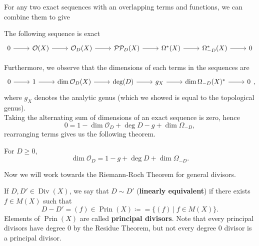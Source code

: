 \documentclass{article}
\begin{document}
{For any two exact sequences with an overlapping terms and functions, we can combine them to give
\begin{theorem}
    The following sequence is exact
\[\begin{tikzcd}
	0 & {\mathcal{O}(X)} & {\mathcal{O}_D(X)} & {\mathcal{P}\mathcal{P}_D(X)} & {\Omega^*(X)} & {\Omega_{-D}^*(X)} & 0
	\arrow[from=1-1, to=1-2]
	\arrow[from=1-2, to=1-3]
	\arrow[from=1-3, to=1-4]
	\arrow[from=1-4, to=1-5]
	\arrow[from=1-5, to=1-6]
	\arrow[from=1-6, to=1-7]
\end{tikzcd}\]
\end{theorem}

Furthermore, we observe that the dimensions of each terms in the sequences are
\[\begin{tikzcd}
	0 & 1 & {\dim \mathcal{O}_D(X)} & {\deg(D)} & {g_X} & {\dim \Omega_{-D}(X)^*} & 0
	\arrow[from=1-1, to=1-2]
	\arrow[from=1-2, to=1-3]
	\arrow[from=1-3, to=1-4]
	\arrow[from=1-4, to=1-5]
	\arrow[from=1-5, to=1-6]
	\arrow[from=1-6, to=1-7]
\end{tikzcd},\]
where $g_X$ denotes the analytic genus (which we showed is equal to the topological genus).\\

Taking the alternating sum of dimensions of an exact sequence is zero, hence
\[0 = 1 - \dim \mathcal{O}_D + \deg D - g + \dim \Omega_{-D},\]
rearranging terms gives us the following theorem.

\begin{theorem}
    For $D \geq 0$,
    \[\dim \mathcal{O}_D = 1 - g + \deg D + \dim \Omega_{-D}.\]
\end{theorem}

Now we will work towards the Riemann-Roch Theorem for general divisors.

\begin{definition}
 If $D, D' \in \operatorname{Div}(X)$,  we say that $D \sim D'$ (\textbf{linearly equivalent}) if there exists $f \in M(X)$ such that
 \[D - D' = (f) \in \operatorname{Prin}(X) \coloneqq = \{(f)\ |\ f \in M(X)\}.\]
 Elements of $\operatorname{Prin}(X)$ are called \textbf{principal divisors}. Note that every principal divisors have degree $0$ by the Residue Theorem, but not every degree $0$ divisor is a principal divisor.
\end{definition}

}
\end{document}
